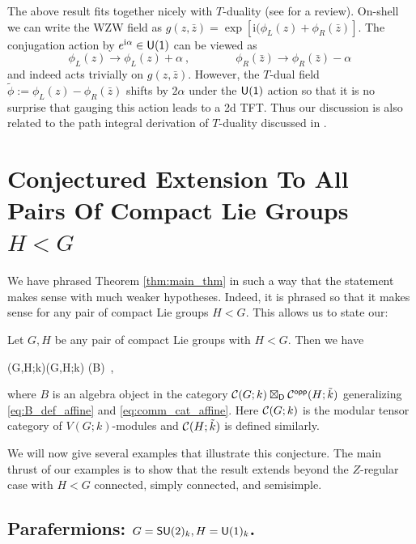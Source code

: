 \documentclass[a4paper,11pt]{article}
\newcommand{\im}{\mathrm{i}}
\newcommand{\tsf}[1]{\textsf{#1}}
\newcommand{\wt}[1]{\widetilde{#1}}
\def\be{ \begin{equation} }
\def\ee{ \end{equation}}
\def\CC {{\cal C}}
\begin{document}
The above result fits together nicely with $T$-duality (see \cite{Giveon:1994fu} for a review). On-shell we can write the \tsf{WZW} field 
as $g(z,\bar z) = \exp[ \im (\phi_L(z) + \phi_R(\bar z)]$. The conjugation action by $e^{\im \alpha} \in \mr{U(1)}$ can be viewed as 
%
\be 
\phi_L(z) \rightarrow  \phi_L(z) + \alpha~, \qquad \qquad \phi_R(\bar z) \rightarrow \phi_R(\bar z) - \alpha~ 
\ee
%
and indeed acts trivially on $g(z,\bar z)$. However,   the $T$-dual field $\tilde \phi := \phi_L(z) - \phi_R(\bar z)$ shifts by $2\alpha$ under the $\mathsf{U(1)}$ action so that it is no surprise that gauging this action leads to a 2d \tsf{TFT}. Thus our discussion is also related to the path integral derivation of $T$-duality discussed in \cite{Rocek:1991ps}.




\section{Conjectured Extension To All Pairs Of Compact Lie Groups $H< G$}\label{sec:other_examples}

We have phrased Theorem   \ref{thm:main_thm} in such a way that the statement makes sense
with much weaker hypotheses. Indeed, it is phrased so that it makes sense for any 
pair of compact Lie groups $H< G$. This allows us to state our: 

\begin{conj}
Let $G,H$ be any pair of compact  Lie groups with  $H< G$. Then we have 
\begin{eqsp}
    (G,H;k)\cong {}(G,H;k)\,\wt{\otimes}\,(B)~,  
\end{eqsp}
where $B$ is an algebra object in the category $\CC(G;k)\boxtimes_{\mr{D}}\CC^{\mr{opp}}(H;\tilde k)$ generalizing \eqref{eq:B_def_affine} and \eqref{eq:comm_cat_affine}. Here  $\CC(G;k)$ is the modular tensor category of $V(G;k)$-modules and $\CC(H;\tilde k)$ is defined similarly.
\end{conj}
%
 
We will now give several examples that illustrate this conjecture. The main thrust of our examples is to show that the result extends beyond the $Z$-regular case with $H<G$ connected, simply connected, and semisimple. 

\subsection{Parafermions: $G=\mathsf{SU}(2)_k,H=\mathsf{U}(1)_k$.}\label{sec:parafermions}
\end{document}
